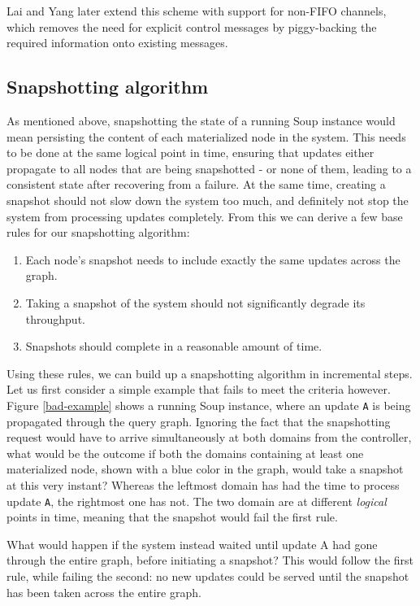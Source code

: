 \documentclass[b5paper]{report}
\begin{document}
Lai and Yang \cite{lai-yang} later extend this scheme with support for non-FIFO
channels, which removes the need for explicit control messages by piggy-backing
the required information onto existing messages.

\subsection{Snapshotting algorithm}
As mentioned above, snapshotting the state of a running Soup instance would mean
persisting the content of each materialized node in the system. This needs to be
done at the same logical point in time, ensuring that updates either
propagate to all nodes that are being snapshotted - or none of them, leading to
a consistent state after recovering from a failure. At the same time,
creating a snapshot should not slow down the system too much, and definitely not
stop the system from processing updates completely. From this we can derive a
few base rules for our snapshotting algorithm:

\begin{enumerate}
  \item Each node's snapshot needs to include exactly the same updates across
    the graph.
  \item Taking a snapshot of the system should not significantly degrade its
    throughput.
  \item Snapshots should complete in a reasonable amount of time.
\end{enumerate}

Using these rules, we can build up a snapshotting algorithm in incremental
steps. Let us first consider a simple example that fails to meet the criteria
however. Figure \ref{bad-example} shows a running Soup instance, where an update
\texttt{A} is being propagated through the query graph. Ignoring the fact that
the snapshotting request would have to arrive simultaneously at both domains
from the controller, what would be the outcome if both the domains containing at
least one materialized node, shown with a blue color in the graph, would take
a snapshot at this very instant? Whereas the leftmost domain has had the time to
process update \texttt{A}, the rightmost one has not. The two domain are at
different \textit{logical} points in time, meaning that the snapshot would fail
the first rule.

What would happen if the system instead waited until update A had gone through
the entire graph, before initiating a snapshot? This would follow the first
rule, while failing the second: no new updates could be served until the
snapshot has been taken across the entire graph.
\end{document}
